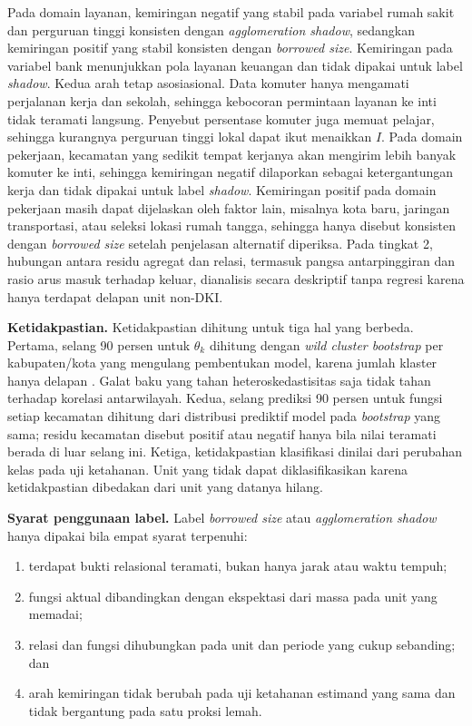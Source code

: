 \documentclass[12pt,a4paper,oneside,openany,indonesian]{report}
\begin{document}
Pada domain layanan, kemiringan negatif yang stabil pada variabel rumah
sakit dan perguruan tinggi konsisten dengan \emph{agglomeration
shadow}, sedangkan kemiringan positif yang stabil konsisten dengan
\emph{borrowed size}. Kemiringan pada variabel bank menunjukkan pola
layanan keuangan dan tidak dipakai untuk label \emph{shadow}. Kedua arah
tetap asosiasional. Data komuter hanya mengamati perjalanan kerja dan sekolah, sehingga kebocoran
permintaan layanan ke inti tidak teramati langsung. Penyebut persentase
komuter juga memuat pelajar, sehingga kurangnya perguruan tinggi lokal
dapat ikut menaikkan $I$. Pada domain pekerjaan, kecamatan yang sedikit
tempat kerjanya akan mengirim lebih banyak komuter ke inti, sehingga
kemiringan negatif dilaporkan sebagai ketergantungan kerja dan tidak
dipakai untuk label \emph{shadow}. Kemiringan positif pada domain
pekerjaan masih dapat dijelaskan oleh faktor lain, misalnya kota baru,
jaringan transportasi, atau seleksi lokasi rumah tangga, sehingga hanya
disebut konsisten dengan \emph{borrowed size} setelah penjelasan
alternatif diperiksa. Pada tingkat 2, hubungan antara residu agregat
dan relasi, termasuk pangsa antarpinggiran dan rasio arus masuk
terhadap keluar, dianalisis secara deskriptif tanpa regresi karena hanya
terdapat delapan unit non-DKI.

\textbf{Ketidakpastian.} Ketidakpastian dihitung untuk tiga hal yang
berbeda. Pertama,
selang 90 persen untuk $\theta_k$ dihitung dengan \emph{wild cluster
bootstrap} per kabupaten/kota yang mengulang pembentukan model, karena
jumlah klaster hanya delapan \parencite{camerongelbachmiller2008}.
Galat baku yang tahan heteroskedastisitas saja tidak tahan terhadap
korelasi antarwilayah. Kedua, selang prediksi 90 persen untuk fungsi
setiap kecamatan dihitung dari distribusi prediktif model pada
\emph{bootstrap} yang sama; residu kecamatan disebut positif atau
negatif hanya bila nilai teramati berada di luar selang ini. Ketiga,
ketidakpastian klasifikasi dinilai dari perubahan kelas pada uji
ketahanan. Unit yang tidak dapat diklasifikasikan karena ketidakpastian
dibedakan dari unit yang datanya hilang.

\textbf{Syarat penggunaan label.} Label \emph{borrowed size} atau
\emph{agglomeration shadow} hanya dipakai bila empat syarat terpenuhi:

\begin{enumerate}
\tightlist
\item
  terdapat bukti relasional teramati, bukan hanya jarak atau waktu
  tempuh;
\item
  fungsi aktual dibandingkan dengan ekspektasi dari massa pada unit yang
  memadai;
\item
  relasi dan fungsi dihubungkan pada unit dan periode yang cukup
  sebanding; dan
\item
  arah kemiringan tidak berubah pada uji ketahanan estimand yang sama
  dan tidak bergantung pada satu proksi lemah.
\end{enumerate}
\end{document}
